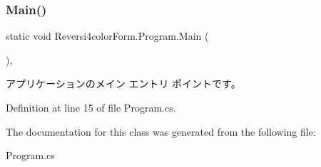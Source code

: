 \subsubsection{\texorpdfstring{Main()}{Main()}}
{\footnotesize\ttfamily static void Reversi4color\+Form.\+Program.\+Main (\begin{DoxyParamCaption}{ }\end{DoxyParamCaption})\hspace{0.3cm}{\ttfamily [static]}, {\ttfamily [private]}}



アプリケーションのメイン エントリ ポイントです。 



Definition at line 15 of file Program.\+cs.



The documentation for this class was generated from the following file\+:\begin{DoxyCompactItemize}
\item 
Program.\+cs\end{DoxyCompactItemize}
